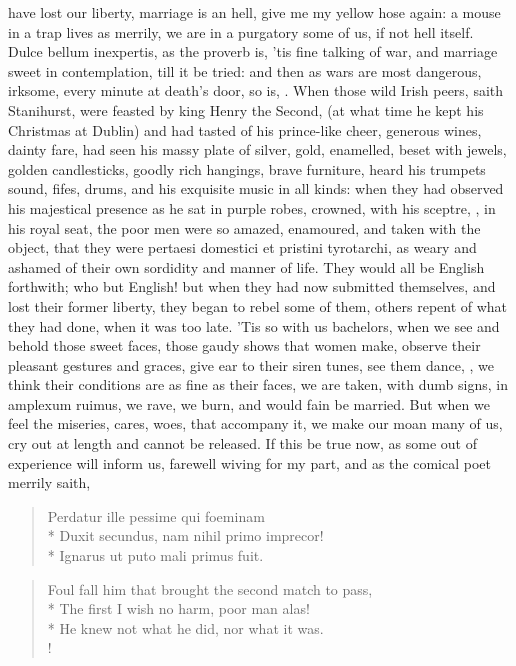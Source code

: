 have lost our liberty, marriage is an hell, give me my yellow hose
again: a mouse in a trap lives as merrily, we are in a purgatory some
of us, if not hell itself. Dulce bellum inexpertis, as the proverb is,
'tis fine talking of war, and marriage sweet in contemplation, till it
be tried: and then as wars are most dangerous, irksome, every minute at
death's door, so is, \etc{}. When those wild Irish peers, saith
Stanihurst, were feasted by king Henry the Second, (at what time
he kept his Christmas at Dublin) and had tasted of his prince-like
cheer, generous wines, dainty fare, had seen his massy plate of
silver, gold, enamelled, beset with jewels, golden candlesticks, goodly
rich hangings, brave furniture, heard his trumpets sound, fifes, drums,
and his exquisite music in all kinds: when they had observed his
majestical presence as he sat in purple robes, crowned, with his
sceptre, \etc{}, in his royal seat, the poor men were so amazed,
enamoured, and taken with the object, that they were pertaesi domestici
et pristini tyrotarchi, as weary and ashamed of their own sordidity and
manner of life. They would all be English forthwith; who but English!
but when they had now submitted themselves, and lost their former
liberty, they began to rebel some of them, others repent of what they
had done, when it was too late. 'Tis so with us bachelors, when we see
and behold those sweet faces, those gaudy shows that women make,
observe their pleasant gestures and graces, give ear to their siren
tunes, see them dance, \etc{}, we think their conditions are as fine as
their faces, we are taken, with dumb signs, in amplexum ruimus, we
rave, we burn, and would fain be married. But when we feel the
miseries, cares, woes, that accompany it, we make our moan many of us,
cry out at length and cannot be released. If this be true now, as some
out of experience will inform us, farewell wiving for my part, and as
the comical poet merrily saith,
%
\begin{latin}%
\begin{verse}%
Perdatur ille pessime qui foeminam\\*
Duxit secundus, nam nihil primo imprecor!\\*
Ignarus ut puto mali primus fuit.
\end{verse}%
\end{latin}%
\translationrule%
\begin{verse}%
Foul fall him that brought the second match to pass,\\*
The first I wish no harm, poor man alas!\\*
He knew not what he did, nor what it was.\\!
\end{verse}%
%

